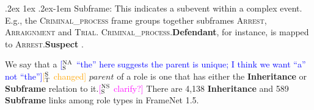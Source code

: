 \documentclass[11pt,a4paper]{article}
\makeatletter
\newcommand{\ensuretext}[1]{#1}
\newcommand{\nssmarker}{\ensuretext{\textcolor{magenta}{\ensuremath{^{\textsc{NS}}_{\textsc{S}}}}}}
\newcommand{\stmarker}{\ensuretext{\textcolor{orange}{\ensuremath{^{\textsc{S}}_{\textsc{T}}}}}}
\newcommand{\nasmarker}{\ensuretext{\textcolor{blue}{\ensuremath{^{\textsc{NA}}_{\textsc{S}}}}}}
\newcommand{\arkcomment}[3]{\ensuretext{\textcolor{#3}{[#1 #2]}}}
\newcommand{\nss}[1]{\arkcomment{\nssmarker}{#1}{magenta}}
\newcommand{\st}[1]{\arkcomment{\stmarker}{#1}{orange}}
\newcommand{\nascomment}[1]{\arkcomment{\nasmarker}{#1}{blue}}
\renewcommand{\paragraph}{%
  \@startsection{paragraph}{4}%
  {\z@}{.2ex \@plus 1ex \@minus .2ex}{-1em}%
  {\normalfont\normalsize\bfseries}%
}
\newcommand{\fnf}[1]{\textsc{\textsf{#1}}} %
\newcommand{\fnr}[1]{\textbf{\textsf{#1}}} %
\newcommand{\fnlu}[1]{\textsf{#1}} %
\newcommand{\finalversion}[1]{}
\makeatother
\begin{document}

\paragraph{Subframe:} This indicates a subevent within a complex event. 
E.g., the \fnf{Criminal\_process} frame groups together subframes 
\fnf{Arrest}, \fnf{Arraignment} and \fnf{Trial}.
\fnf{Criminal\_process}.\fnr{Defendant}, for instance, is mapped to 
\fnf{Arrest}.\fnr{Suspect}%
\finalversion{
\fnf{Trial}.\fnr{Defendant}, and \fnf{Sentencing}.\fnr{Convict}
}.

We say that a \nascomment{``the'' here suggests the parent is
unique; I think we want ``a'' not ``the''}\st{changed} $\textit{parent}$ of a
role is one that has either the \textbf{Inheritance} or \textbf{Subframe}
relation to it.\nss{clarify?}
There are 4,138 \textbf{Inheritance} and 589 \textbf{Subframe} links among role
types in FrameNet 1.5.
\end{document}
